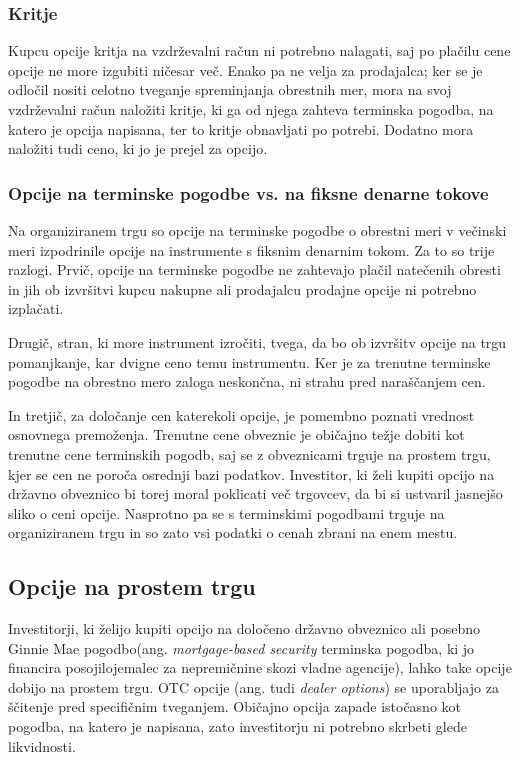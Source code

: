 \documentclass[a4paper]{article}
\begin{document}
\subsubsection{Kritje}
Kupcu opcije kritja na vzdrževalni račun ni potrebno nalagati, saj po plačilu cene opcije ne more izgubiti ničesar več. Enako 
pa ne velja za prodajalca; ker se je odločil nositi celotno tveganje spreminjanja obrestnih mer, mora na svoj vzdrževalni račun
naložiti kritje, ki ga od njega zahteva terminska pogodba, na katero je opcija napisana, ter to kritje obnavljati po potrebi.
Dodatno mora naložiti tudi ceno, ki jo je prejel za opcijo.

\subsubsection{Opcije na terminske pogodbe vs. na fiksne denarne tokove}
Na organiziranem trgu so opcije na terminske pogodbe o obrestni meri v večinski meri izpodrinile opcije na instrumente s fiksnim
denarnim tokom. Za to so trije razlogi. Prvič, opcije na terminske pogodbe ne zahtevajo plačil natečenih obresti in jih ob izvršitvi kupcu
nakupne ali prodajalcu prodajne opcije ni potrebno izplačati.

Drugič, stran, ki more instrument izročiti, tvega, da bo ob izvršitv opcije na trgu pomanjkanje, kar dvigne ceno temu instrumentu.
Ker je za trenutne terminske pogodbe na obrestno mero zaloga neskončna, ni strahu pred naraščanjem cen. 

In tretjič, za določanje cen katerekoli opcije, je pomembno poznati vrednost osnovnega premoženja.
Trenutne cene obveznic je običajno težje dobiti kot trenutne cene terminskih pogodb, saj se z obveznicami trguje na prostem trgu, kjer
se cen ne poroča osrednji bazi podatkov. Investitor, ki želi kupiti opcijo na državno obveznico bi torej moral poklicati več trgovcev, 
da bi si ustvaril jasnejšo sliko o ceni opcije. Nasprotno pa se s terminskimi pogodbami trguje na organiziranem trgu in so zato vsi 
podatki o cenah zbrani na enem mestu. 

\subsection{Opcije na prostem trgu}
Investitorji, ki želijo kupiti opcijo na določeno državno obveznico ali posebno Ginnie Mae pogodbo(ang. \textit{mortgage-based security}
terminska pogodba, ki jo financira posojilojemalec za nepremičnine skozi vladne agencije), lahko take opcije dobijo na prostem trgu.
OTC opcije (ang. tudi \textit{dealer options}) se uporabljajo za ščitenje pred specifičnim tveganjem. Običajno opcija zapade istočasno
kot pogodba, na katero je napisana, zato investitorju ni potrebno skrbeti glede likvidnosti.
\end{document}
